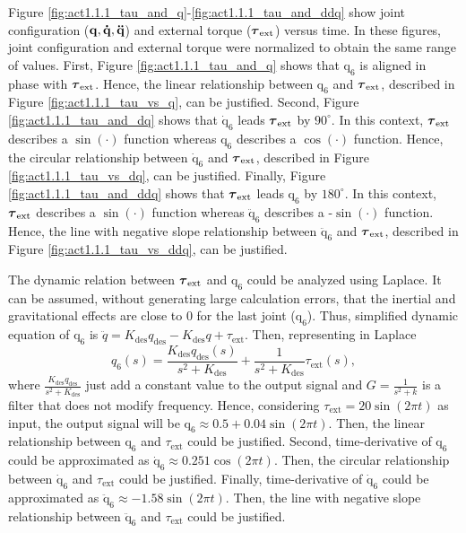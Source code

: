 Figure \ref{fig:act1.1.1_tau_and_q}-\ref{fig:act1.1.1_tau_and_ddq} show joint configuration ($\mathbf{q, \dot{q}, \ddot{q}}$) and external torque ($\boldsymbol{\tau}_\mathrm{ext}$) versus time. In these figures, joint configuration and external torque were normalized to obtain the same range of values\normalizenote. First, Figure \ref{fig:act1.1.1_tau_and_q} shows that $\mathrm{q_6}$ is aligned in phase with $\boldsymbol{\tau}_\mathrm{ext}$. Hence, the linear relationship between $\mathrm{q_6}$ and $\boldsymbol{\tau}_\mathrm{ext}$, described in Figure \ref{fig:act1.1.1_tau_vs_q}, can be justified. Second, Figure \ref{fig:act1.1.1_tau_and_dq} shows that $\mathrm{\dot{q}_6}$ leads $\boldsymbol{\tau}_\mathrm{ext}$ by $90^{\circ}$. In this context, $\boldsymbol{\tau}_\mathrm{ext}$ describes a $\sin{(\cdot)}$ function whereas $\mathrm{q_6}$ describes a $\cos{(\cdot)}$ function. Hence, the circular relationship between $\mathrm{\dot{q}_6}$ and $\boldsymbol{\tau}_\mathrm{ext}$, described in Figure \ref{fig:act1.1.1_tau_vs_dq}, can be justified. Finally, Figure \ref{fig:act1.1.1_tau_and_ddq} shows that $\boldsymbol{\tau}_\mathrm{ext}$ leads $\mathrm{q_6}$ by $180^{\circ}$. In this context, $\boldsymbol{\tau}_\mathrm{ext}$ describes a $\sin{(\cdot)}$ function whereas $\mathrm{\ddot{q}_6}$ describes a -$\sin{(\cdot)}$ function. Hence, the line with negative slope relationship between $\mathrm{\ddot{q}_6}$ and $\boldsymbol{\tau}_\mathrm{ext}$, described in Figure \ref{fig:act1.1.1_tau_vs_ddq}, can be justified.

The dynamic relation between $\boldsymbol{\tau}_\mathrm{ext}$ and $\mathrm{q_6}$ could be analyzed using Laplace. It can be assumed, without generating large calculation errors, that the inertial and gravitational effects are close to $0$ for the last joint ($\mathrm{q_6}$). Thus, simplified dynamic equation of $\mathrm{q_6}$ is $\ddot{q}=K_\mathrm{des}q_\mathrm{des} - K_\mathrm{des}q + \tau_\mathrm{ext}$. Then, representing in Laplace
\begin{equation*}
q_{6}(s) = \frac{K_\mathrm{des} q_\mathrm{des}(s)}{s^2 + K_\mathrm{des}} + \frac{1}{s^2 + K_\mathrm{des}} \tau_\mathrm{ext}(s), 
\end{equation*}
where $\frac{K_\mathrm{des} q_\mathrm{des}}{s^2 + K_\mathrm{des}}$ just add a constant value to the output signal and $G=\frac{1}{s^2 + k}$ is a filter that does not modify frequency. Hence, considering $\tau_\mathrm{ext}= 20\sin{(2\pi t)}$ as input, the output signal will be $\mathrm{q_6}\approx 0.5 + 0.04\sin{(2\pi t)}$. Then, the linear relationship between $\mathrm{q_6}$ and $\tau_\mathrm{ext}$ could be justified. Second, time-derivative of $\mathrm{q_6}$ could be approximated as $\mathrm{\dot{q}_6} \approx 0.251\cos{(2\pi t)}$. Then, the circular relationship between $\mathrm{\dot{q}_6}$ and $\tau_\mathrm{ext}$ could be justified. Finally, time-derivative of $\mathrm{\dot{q}_6}$ could be approximated as $\mathrm{\ddot{q}_6} \approx -1.58\sin{(2\pi t)}$. Then, the line with negative slope relationship between $\mathrm{\ddot{q}_6}$ and $\tau_\mathrm{ext}$ could be justified.


